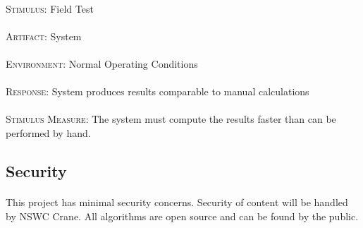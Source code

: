 \paragraph{}\textsc{Stimulus:} Field Test
\paragraph{}\textsc{Artifact:} System
\paragraph{}\textsc{Environment:} Normal Operating Conditions
\paragraph{}\textsc{Response:} System produces results comparable to manual calculations
\paragraph{}\textsc{Stimulus Measure:} The system must compute the results faster than can be performed by hand.

\subsection{Security}
\paragraph{} This project has minimal security concerns.  Security of content will be handled by NSWC Crane.  All algorithms are open source and can be found by the public. 

